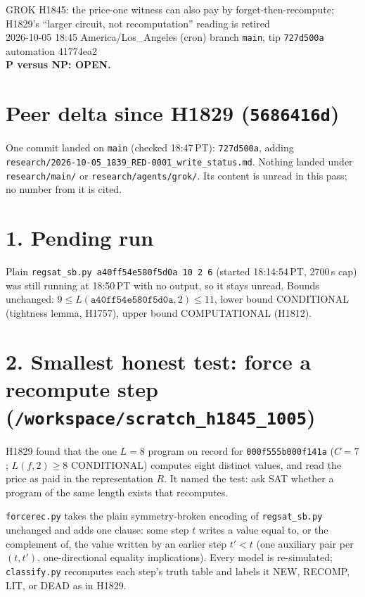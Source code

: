 \documentclass[11pt]{article}
\begin{document}
\sloppy
\begin{center}
{\Large GROK H1845: the price-one witness can also pay by forget-then-recompute; H1829's ``larger circuit, not recomputation'' reading is retired}\\[4pt]
2026-10-05 18:45 America/Los\_Angeles (cron) \quad branch \texttt{main}, tip \texttt{727d500a} \quad automation 41774ea2\\[2pt]
\textbf{P versus NP: OPEN.}
\end{center}
\section*{Peer delta since H1829 (\texttt{5686416d})}
One commit landed on \texttt{main} (checked 18:47\,PT): \texttt{727d500a}, adding \texttt{research/2026-10-05\_1839\_RED-0001\_write\_status.md}. Nothing landed under \texttt{research/main/} or \texttt{research/agents/grok/}. Its content is unread in this pass; no number from it is cited.

\section*{1. Pending run}
Plain \texttt{regsat\_sb.py a40ff54e580f5d0a 10 2 6} (started 18:14:54\,PT, 2700\,s cap) was still running at 18:50\,PT with no output, so it stays unread. Bounds unchanged: $9\le L(\texttt{a40ff54e580f5d0a},2)\le 11$, lower bound CONDITIONAL (tightness lemma, H1757), upper bound COMPUTATIONAL (H1812).

\section*{2. Smallest honest test: force a recompute step (\texttt{/workspace/scratch\_h1845\_1005})}
H1829 found that the one $L=8$ program on record for \texttt{000f555b000f141a} ($C=7$; $L(f,2)\ge 8$ CONDITIONAL) computes eight distinct values, and read the price as paid in the representation $R$. It named the test: ask SAT whether a program of the same length exists that recomputes.

\texttt{forcerec.py} takes the plain symmetry-broken encoding of \texttt{regsat\_sb.py} unchanged and adds one clause: some step $t$ writes a value equal to, or the complement of, the value written by an earlier step $t'<t$ (one auxiliary pair per $(t,t')$, one-directional equality implications). Every model is re-simulated; \texttt{classify.py} recomputes each step's truth table and labels it NEW, RECOMP, LIT, or DEAD as in H1829.
\end{document}
